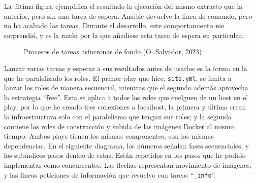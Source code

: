 \documentclass[11pt]{article}
\begin{document}
\begin{flushleft}
    La última figura ejemplifica el resultado la ejecución del mismo extracto que la anterior, pero sin una tarea de espera. Ansible devuelve la linea de comando, pero no ha acabado las tareas. Durante el desarrollo, este comportamiento me sorprendió, y es la razón por la que añadiese esta tarea de espera en particular.
    \linebreak
  
        \begin{figure}[htb]
			\centering
			\caption{Procesos de tareas asíncronas de fondo (O. Salvador, 2023)}
		\end{figure}

  
    Lanzar varias tareas y esperar a sus resultados antes de usarlos es la forma en la que he paralelizado los roles. El primer play que hice, \texttt{site.yml}, se limita a lanzar los roles de manera secuencial, mientras que el segundo además aprovecha la estrategia ``free''. Esta se aplica a todos los roles que cuelguen de un host en el play, por lo que he creado tres conexiones a localhost, la primera y última crean la infraestructura solo con el paralelismo que tengan sus roles; y la segunda contiene los roles de construcción y subida de las imágenes Docker al mismo tiempo. Ambos plays tienen los mismos componentes, con las mismas dependencias. En el siguiente diagrama, los números señalan fases secuenciales, y los subíndices pasos dentro de estas. Están repetidos en los pasos que he podido implementar como concurrentes. Las flechas representan movimiento de imágenes, y las lineas peticiones de información que resuelvo con tareas ``\texttt{\_info}''.
    \linebreak
    

\end{flushleft}
\end{document}
